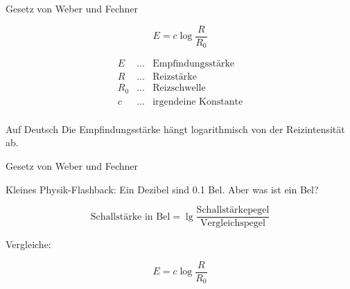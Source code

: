 \documentclass{beamer}
\begin{document}
\begin{frame}{Gesetz von Weber und Fechner}

\[
E = c\log \frac{R}{R_0}
\]


\[
\begin{array}{lll}
E           &\ldots    & \text{Empfindungsstärke} \\
R           & \ldots    & \text{Reizstärke} \\
R_0           & \ldots    & \text{Reizschwelle} \\
c           & \ldots    & \text{irgendeine Konstante} \\
\end{array}
\]

\begin{block}{Auf Deutsch}
Die Empfindungsstärke hängt logarithmisch von der Reizintensität ab.
\end{block}

 
\end{frame}




\begin{frame}{Gesetz von Weber und Fechner}

Kleines Physik-Flashback: Ein Dezibel sind 0.1 Bel. Aber was ist ein Bel? 

\pause

\[
\text{Schallstärke in Bel} = \lg \frac{\text{Schallstärkepegel}}{\text{Vergleichspegel}} 
\]

\pause

Vergleiche: 

\[
E = c\log \frac{R}{R_0}
\]


    
\end{frame}



\end{document}
